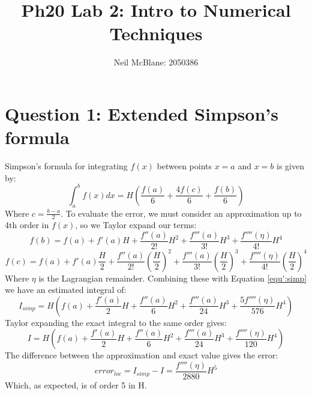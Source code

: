 \documentclass{article}
\begin{document}
\title{Ph20 Lab 2: Intro to Numerical Techniques}
\author{Neil McBlane: 2050386}

\maketitle

\section*{Question 1: Extended Simpson's formula}
Simpson's formula for integrating $f(x)$ between points $x=a$ and $x=b$ is given by:
\begin{equation}
\label{equ:simp}
  \int_a^b f(x)dx = H\left(\frac{f(a)}{6} + \frac{4f(c)}{6} + \frac{f(b)}{6}\right)
\end{equation}
Where $c = \frac{b-a}{2}$. To evaluate the error, we must consider an approximation up to 4th order in $f(x)$, so we Taylor expand our terms:
\begin{equation}
  f(b) = f(a) + f'(a)H + \frac{f''(a)}{2!}H^2 + \frac{f'''(a)}{3!}H^3 + \frac{f''''(\eta)}{4!}H^4
\end{equation} 
\begin{equation}
  f(c) = f(a) + f'(a)\frac{H}{2} + \frac{f''(a)}{2!}\left(\frac{H}{2}\right)^2 + \frac{f'''(a)}{3!}\left(\frac{H}{2}\right)^3 + \frac{f''''(\eta)}{4!}\left(\frac{H}{2}\right)^4
\end{equation}
Where $\eta$ is the Lagrangian remainder. Combining these with Equation \ref{equ':simp} we have an estimated integral of:
\begin{equation}
\label{equ:simpapprox}
  I_{simp} = H\left(f(a) + \frac{f'(a)}{2}H + \frac{f''(a)}{6}H^2 + \frac{f'''(a)}{24}H^3 + \frac{5f''''(\eta)}{576}H^4\right)
\end{equation}
Taylor expanding the exact integral to the same order gives:
\begin{equation}
  I = H\left(f(a) + \frac{f'(a)}{2}H + \frac{f''(a)}{6}H^2 + \frac{f'''(a)}{24}H^3 + \frac{f''''(\eta)}{120}H^4\right)
\end{equation}
The difference between the approximation and exact value gives the error:
\begin{equation}
\label{equ:localerr}
 error_{loc} = I_{simp} - I = \frac{f''''(\eta)}{2880}H^5
\end{equation}
Which, as expected, is of order 5 in H.
\end{document}
